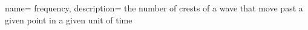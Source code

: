 
 {
    name= frequency,
    description= {the number of crests of a wave that move past a given point in a given unit of time}
} 
